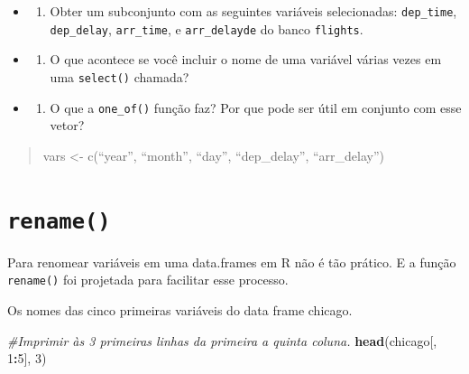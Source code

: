 \documentclass[]{book}
\newenvironment{Shaded}{\begin{snugshade}}{\end{snugshade}}
\newcommand{\CommentTok}[1]{\textcolor[rgb]{0.56,0.35,0.01}{\textit{#1}}}
\newcommand{\DecValTok}[1]{\textcolor[rgb]{0.00,0.00,0.81}{#1}}
\newcommand{\KeywordTok}[1]{\textcolor[rgb]{0.13,0.29,0.53}{\textbf{#1}}}
\newcommand{\NormalTok}[1]{#1}
\newcommand{\OperatorTok}[1]{\textcolor[rgb]{0.81,0.36,0.00}{\textbf{#1}}}
\providecommand{\tightlist}{%
  \setlength{\itemsep}{0pt}\setlength{\parskip}{0pt}}
\begin{document}
\begin{itemize}
\item
  \begin{enumerate}
  \def\labelenumi{\arabic{enumi}.}
  \tightlist
  \item
    Obter um subconjunto com as seguintes variáveis selecionadas: \texttt{dep\_time}, \texttt{dep\_delay}, \texttt{arr\_time}, e \texttt{arr\_delayde} do banco \texttt{flights}.
  \end{enumerate}
\item
  \begin{enumerate}
  \def\labelenumi{\arabic{enumi}.}
  \setcounter{enumi}{1}
  \tightlist
  \item
    O que acontece se você incluir o nome de uma variável várias vezes em uma \texttt{select()} chamada?
  \end{enumerate}
\item
  \begin{enumerate}
  \def\labelenumi{\arabic{enumi}.}
  \setcounter{enumi}{2}
  \tightlist
  \item
    O que a \texttt{one\_of()} função faz? Por que pode ser útil em conjunto com esse vetor?
  \end{enumerate}
\end{itemize}

\begin{quote}
vars \textless{}- c(``year'', ``month'', ``day'', ``dep\_delay'', ``arr\_delay'')
\end{quote}

\hypertarget{rename}{%
\section{\texorpdfstring{\texttt{rename()}}{rename()}}\label{rename}}

Para renomear variáveis em uma data.frames em R não é tão prático. E a função \texttt{rename()} foi projetada para facilitar esse processo.

Os nomes das cinco primeiras variáveis do data frame chicago.

\begin{Shaded}
\begin{Highlighting}[]
\CommentTok{#Imprimir às 3 primeiras linhas da primeira a quinta coluna.}
\KeywordTok{head}\NormalTok{(chicago[, }\DecValTok{1}\OperatorTok{:}\DecValTok{5}\NormalTok{], }\DecValTok{3}\NormalTok{)}
\end{Highlighting}
\end{Shaded}
\end{document}
